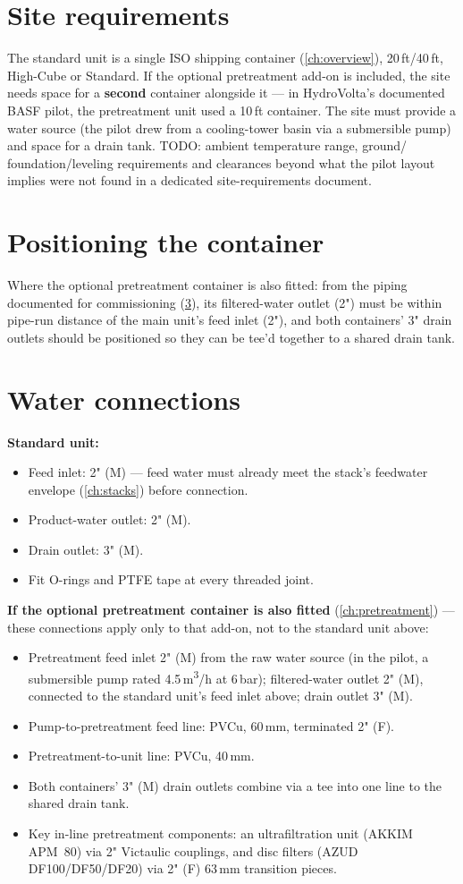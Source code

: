 \documentclass[a4paper,11pt,twoside,openright,numbers=noenddot]{scrreprt}
\begin{document}
\section{Site requirements}
The standard unit is a single ISO shipping container (\cref{ch:overview}),
20\,ft/40\,ft, High-Cube or Standard. If the optional pretreatment
add-on is included, the site needs space for a \textbf{second} container
alongside it --- in HydroVolta's documented BASF pilot, the pretreatment
unit used a 10\,ft container. The site must provide a water source
(the pilot drew from a cooling-tower basin via a submersible pump) and
space for a drain tank. TODO: ambient temperature range, ground/
foundation/leveling requirements and clearances beyond what the pilot
layout implies were not found in a dedicated site-requirements document.

\section{Positioning the container}
Where the optional pretreatment container is also fitted: from the piping documented for commissioning
(\cref{sec:watercx}), its filtered-water outlet (2") must be within
pipe-run distance of the main unit's feed inlet (2"), and both
containers' 3" drain outlets should be positioned so they can be tee'd
together to a shared drain tank.

\section{Water connections}
\label{sec:watercx}
\textbf{Standard unit:}
\begin{itemize}
\item Feed inlet: 2" (M) --- feed water must already meet the stack's
  feedwater envelope (\cref{ch:stacks}) before connection.
\item Product-water outlet: 2" (M).
\item Drain outlet: 3" (M).
\item Fit O-rings and PTFE tape at every threaded joint.
\end{itemize}
\textbf{If the optional pretreatment container is also fitted}
(\cref{ch:pretreatment}) --- these connections apply only to that add-on,
not to the standard unit above:
\begin{itemize}
\item Pretreatment feed inlet 2\textonehalf" (M) from the raw water
  source (in the pilot, a submersible pump rated 4.5\,m\textsuperscript{3}/h
  at 6\,bar); filtered-water outlet 2" (M), connected to the standard
  unit's feed inlet above; drain outlet 3" (M).
\item Pump-to-pretreatment feed line: PVCu, 60\,mm, terminated 2\textonehalf" (F).
\item Pretreatment-to-unit line: PVCu, 40\,mm.
\item Both containers' 3" (M) drain outlets combine via a tee into one
  line to the shared drain tank.
\item Key in-line pretreatment components: an ultrafiltration unit
  (AKKIM APM~80) via 2" Victaulic couplings, and disc filters (AZUD
  DF100/DF50/DF20) via 2" (F) 63\,mm transition pieces.
\end{itemize}
\end{document}
